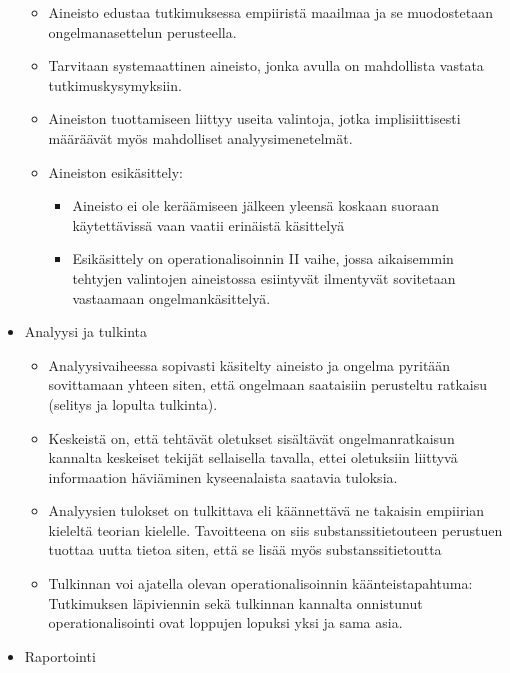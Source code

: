 \documentclass[
]{book}
\providecommand{\tightlist}{%
  \setlength{\itemsep}{0pt}\setlength{\parskip}{0pt}}
\begin{document}
\begin{itemize}
  \begin{itemize}
  \tightlist
  \item
    Aineisto edustaa tutkimuksessa empiiristä maailmaa ja se muodostetaan ongelmanasettelun perusteella.
  \item
    Tarvitaan systemaattinen aineisto, jonka avulla on mahdollista vastata tutkimuskysymyksiin.
  \item
    Aineiston tuottamiseen liittyy useita valintoja, jotka implisiittisesti määräävät myös mahdolliset analyysimenetelmät.
  \item
    Aineiston esikäsittely:

    \begin{itemize}
    \tightlist
    \item
      Aineisto ei ole keräämiseen jälkeen yleensä koskaan suoraan käytettävissä vaan vaatii erinäistä käsittelyä
    \item
      Esikäsittely on operationalisoinnin II vaihe, jossa aikaisemmin tehtyjen valintojen aineistossa esiintyvät ilmentyvät sovitetaan vastaamaan ongelmankäsittelyä.
    \end{itemize}
  \end{itemize}
\item
  Analyysi ja tulkinta

  \begin{itemize}
  \tightlist
  \item
    Analyysivaiheessa sopivasti käsitelty aineisto ja ongelma pyritään sovittamaan yhteen siten, että ongelmaan saataisiin perusteltu ratkaisu (selitys ja lopulta tulkinta).
  \item
    Keskeistä on, että tehtävät oletukset sisältävät ongelmanratkaisun kannalta keskeiset tekijät sellaisella tavalla, ettei oletuksiin liittyvä informaation häviäminen kyseenalaista saatavia tuloksia.
  \item
    Analyysien tulokset on tulkittava eli käännettävä ne takaisin empiirian kieleltä teorian kielelle. Tavoitteena on siis substanssitietouteen perustuen tuottaa uutta tietoa siten, että se lisää myös substanssitietoutta
  \item
    Tulkinnan voi ajatella olevan operationalisoinnin käänteistapahtuma: Tutkimuksen läpiviennin sekä tulkinnan kannalta onnistunut operationalisointi ovat loppujen lopuksi yksi ja sama asia.
  \end{itemize}
\item
  Raportointi


\end{itemize}
\end{document}
